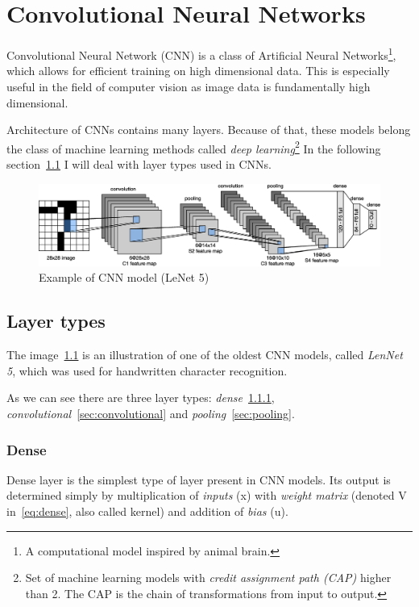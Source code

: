 \chapter{Convolutional Neural Networks}\label{ch:cnn}
Convolutional Neural Network (CNN) is a class of Artificial Neural Networks\footnote{A computational model inspired by
animal brain.}, which allows for efficient training on high dimensional data.
This is especially useful in the field of computer vision as image data is fundamentally high dimensional.

Architecture of CNNs contains many layers.
Because of that, these models belong the class of machine learning methods called
\textit{deep learning}\footnote{Set of machine learning models with \textit{credit assignment path (CAP)} higher than 2.
The CAP is the chain of transformations from input to output.}
In the following section~\ref{sec:layer-types} I will deal with layer types used in CNNs.

\begin{figure}[H]
    \centering
    \includegraphics[width=\columnwidth]{images/cnn/lenet.eps}
    \caption{Example of CNN model (LeNet 5)~\cite{LeNet5}}
    \label{fig:cnn}
\end{figure}

\section{Layer types}\label{sec:layer-types}
The image~\ref{fig:cnn} is an illustration of one of the oldest CNN models, called \textit{LenNet 5}, which was used for
handwritten character recognition.

As we can see there are three layer types: \textit{dense}~\ref{sec:dense},
\textit{convolutional}~\ref{sec:convolutional} and \textit{pooling}~\ref{sec:pooling}.

\subsection{Dense}\label{sec:dense}
Dense layer is the simplest type of layer present in CNN models.
Its output is determined simply by multiplication of \textit{inputs} (x) with \textit{weight matrix}
(denoted V in~\ref{eq:dense}, also called kernel) and addition of \textit{bias} (u).

